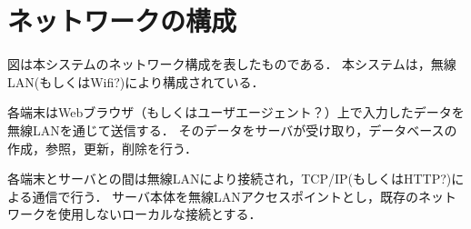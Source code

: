 \section{ネットワークの構成}
図は本システムのネットワーク構成を表したものである．
本システムは，無線LAN(もしくはWifi?)により構成されている．

各端末はWebブラウザ（もしくはユーザエージェント？）上で入力したデータを無線LANを通じて送信する．
そのデータをサーバが受け取り，データベースの作成，参照，更新，削除を行う．

各端末とサーバとの間は無線LANにより接続され，TCP/IP(もしくはHTTP?)による通信で行う．
サーバ本体を無線LANアクセスポイントとし，既存のネットワークを使用しないローカルな接続とする．
